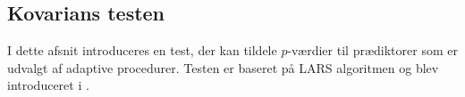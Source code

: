 \subsection{Kovarians testen} \label{subsec:kovarians_test}
I dette afsnit introduceres en test, der kan tildele \(p\)-værdier til prædiktorer som er udvalgt af adaptive procedurer.
Testen er baseret på LARS algoritmen og blev introduceret i \citep{lockhart}.


